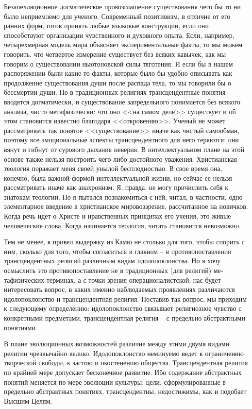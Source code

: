 \documentclass{book}
\begin{document}
Безапелляционное догматическое провозглашение существования чего бы то ни было неприемлемо для ученого. Современ­ный позитивизм, в отличие от его ранних форм, готов принять любые языковые конструкции, если они способствуют организации чувственного и духовного опыта. Если, например, четырехмерная модель мира объясняет экспериментальные факты, то мы можем говорить, что четвертое измерение существует без всяких кавычек, как мы говорим о существовании ньютоновской силы тяготения. И если бы в нашем распоряжении были какие-то факты, которые было бы удобно описывать как продолжение существования души после распада тела, то мы говорили бы о бессмертии души. Но в традиционных религиях трансцендентные понятия вводятся догматически, и существование запредельного понимается без всякого анализа, чисто метафизически: что оно <<на самом деле>> существует и об этом становится известно благодаря <<откровению>>. Уче­ный не может рассматривать так понятое <<существование>> иначе как чистый самообман, поэтому все эмоциональные 
ас­пекты трансцендентного для него теряются: они вянут и гибнут от сурового дыхания неверия. В интеллектуальном плане на этой основе также нельзя построить чего-либо достойного уважения. Христианская теология поражает меня своей уны­лой бесплодностью. В свое время она, конечно, была важной формой интеллектуальной жизни, но сейчас ее нельзя рассматривать иначе как анахронизм. Я, правда, не могу причислить себя к знатокам теологии. Но я пытался познакомиться с ней, читал, в частности, одно элементарное введение в христианское мировоззрение, рассчитанное на новичков. Когда речь идет о Христе и нравственных принципах его учения, это живые человеческие слова. Когда начинается теология, читать стано­вится невозможно.

Тем не менее, я привел выдержку из Камю не столько для того, чтобы спорить с ним, сколько для того, чтобы согласиться в главном -- в противопоставлении трансцендентных религий различным видам идолопоклонства. Но я хочу осмыслить это противопоставление не в традиционных (для религий) ме­тафизических терминах, а с точки зрения операционалистской: нас будет интересовать вопрос, в каких именно наблюдаемых проявлениях  различаются идолопоклонство и трансцендент­ная религия. Поставив так вопрос, мы приходим к следующему определению: идолопоклонство связывает религиозное чувст­во с конкретными предметами,  трансцендентная религия -- с предельно абстрактными понятиями. 

В плане эволюционных возможностей различие между этими двумя видами религии чрезвычайно велико. Идолопоклонство неминуемо ведет к ограничению творческой свободы, к застою и окостенению общества. Трансцендентная религия по край­ней мере допускает  бесконечное развитие. Ибо содержание аб­страктных понятий меняется по мере эволюции культуры; це­ли, сформулированные в предельно абстрактных понятиях, трансцендентны, недостижимы, как и подобает Высшим Целям.
\end{document}
